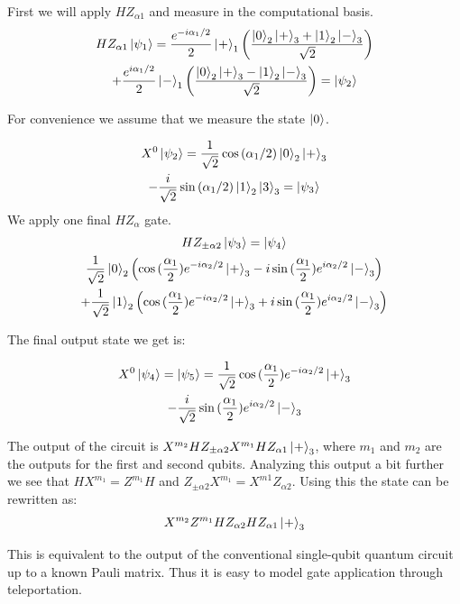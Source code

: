 \documentclass[twocolumn]{Styles/IEEEtran11}
\begin{document}
First we will apply $HZ_{\alpha1}$ and measure in the computational basis. 
{
\begin{gather*}
HZ_{\alpha1}\ket{\psi_1}=\frac{e^{-i\alpha_{1}/2}}{2}\ket{+}_1\left(\frac{\ket{0}_2\ket{+}_3+\ket{1}_2\ket{-}_3}{\sqrt2}\right)\\
+\frac{e^{i\alpha_{1}/2}}{2}\ket{-}_1\left(\frac{\ket{0}_2\ket{+}_3-\ket{1}_2\ket{-}_3}{\sqrt2}\right)=\ket{\psi_2}
\end{gather*}
}%


For convenience we assume that we measure the state $\ket{0}$.

{
\begin{gather*}
X^{0}\ket{\psi_2}=\frac{1}{\sqrt2}\cos{(\alpha_1/2)}\ket{0}_2\ket{+}_3\\
-\frac{i}{\sqrt2}\sin{(\alpha_1/2)}\ket{1}_2\ket{3}_3=\ket{\psi_3}
\end{gather*}
}%
\vspace{2ex}
We apply one final $HZ_{\alpha}$ gate. 
{
\begin{gather*}
HZ_{\pm\alpha2}\ket{\psi_{3}}=\ket{\psi_4}\\
\frac{1}{\sqrt2}\ket{0}_2\left(\cos{(\frac{\alpha_1}{2})}e^{-i\alpha_2/2}\ket{+}_3-i\sin{(\frac{\alpha_1}{2})}e^{i\alpha_2/2}\ket{-}_3\right)\\
+\frac{1}{\sqrt2}\ket{1}_2\left(\cos{(\frac{\alpha_1}{2})}e^{-i\alpha_2/2}\ket{+}_3+i\sin{(\frac{\alpha_1}{2})}e^{i\alpha_2/2}\ket{-}_3\right)
\end{gather*}
}%

The final output state we get is:

{
\begin{gather*}
X^{0}\ket{\psi_{4}}=\ket{\psi_5}=\frac{1}{\sqrt2}\cos{(\frac{\alpha_1}{2})}e^{-i\alpha_2/2}\ket{+}_3\\
-\frac{i}{\sqrt2}\sin{(\frac{\alpha_1}{2})}e^{i\alpha_2/2}\ket{-}_3
\end{gather*}
}%

 The output of the circuit is $X^{m_2}HZ_{\pm\alpha2}X^{m_1}HZ_{\alpha1}\ket{+}_3$, where $m_1$ and $m_2$ are the outputs for the first and second qubits. Analyzing this output a bit further we see that $HX^{m_1}=Z^{m_1}H$ and $Z_{\pm\alpha2}X^{m_1}=X^{m1}Z_{\alpha2}$. Using this the state can be rewritten as:
\begin{gather*}
X^{m_2}Z^{m_1}HZ_{\alpha2}HZ_{\alpha1}\ket{+}_3
\end{gather*}

This is equivalent to the output of the conventional single-qubit quantum circuit up to a known Pauli matrix. Thus it is easy to model gate application through teleportation.
\end{document}
